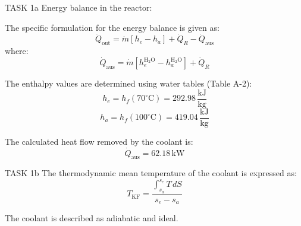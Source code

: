 TASK 1a  
Energy balance in the reactor:  

The specific formulation for the energy balance is given as:  
\[
\dot{Q}_{\text{out}} = \dot{m} \left[ h_e - h_a \right] + \dot{Q}_R - \dot{Q}_{\text{aus}}
\]  
where:  
\[
\dot{Q}_{\text{aus}} = \dot{m} \left[ h_e^{\text{H}_2\text{O}} - h_a^{\text{H}_2\text{O}} \right] + \dot{Q}_R
\]  

The enthalpy values are determined using water tables (Table A-2):  
\[
h_e = h_f(70^\circ\text{C}) = 292.98 \, \frac{\text{kJ}}{\text{kg}}
\]  
\[
h_a = h_f(100^\circ\text{C}) = 419.04 \, \frac{\text{kJ}}{\text{kg}}
\]  

The calculated heat flow removed by the coolant is:  
\[
\dot{Q}_{\text{aus}} = 62.18 \, \text{kW}
\]  

TASK 1b  
The thermodynamic mean temperature of the coolant is expressed as:  
\[
T_{\text{KF}} = \frac{\int_{s_a}^{s_e} T \, dS}{s_e - s_a}
\]  

The coolant is described as adiabatic and ideal.